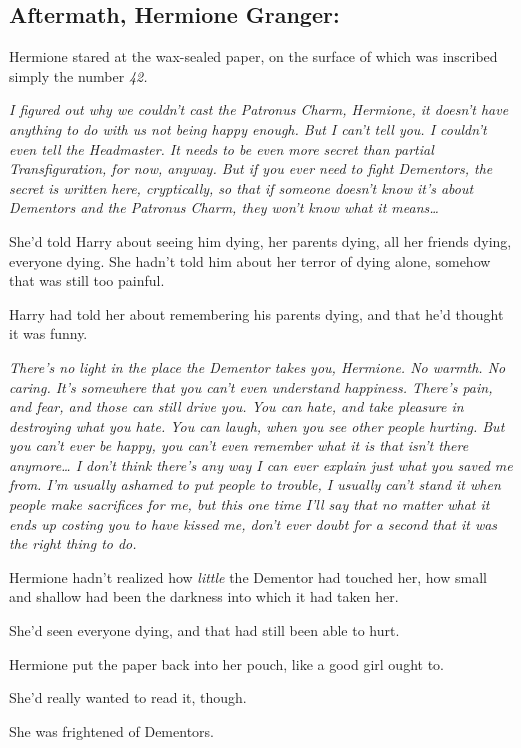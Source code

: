 \subsection{Aftermath, Hermione Granger:}

Hermione stared at the wax-sealed paper, on the surface of which was inscribed 
simply the number \emph{42.}

\emph{I figured out why we couldn't cast the Patronus Charm, Hermione, it 
doesn't have anything to do with us not being happy enough. But I can't tell 
you. I couldn't even tell the Headmaster. It needs to be even more secret than 
partial Transfiguration, for now, anyway. But if you ever need to fight 
Dementors, the secret is written here, cryptically, so that if someone doesn't 
know it's about Dementors and the Patronus Charm, they won't know what it 
means{\ldots}}

She'd told Harry about seeing him dying, her parents dying, all her friends 
dying, everyone dying. She hadn't told him about her terror of dying alone, 
somehow that was still too painful.

Harry had told her about remembering his parents dying, and that he'd thought 
it was funny.

\emph{There's no light in the place the Dementor takes you, Hermione. No 
warmth. No caring. It's somewhere that you can't even understand happiness. 
There's pain, and fear, and those can still drive you. You can hate, and take 
pleasure in destroying what you hate. You can laugh, when you see other people 
hurting. But you can't ever be happy, you can't even remember what it is that 
isn't there anymore{\ldots} I don't think there's any way I can ever explain 
just what you saved me from. I'm usually ashamed to put people to trouble, I 
usually can't stand it when people make sacrifices for me, but this one time 
I'll say that no matter what it ends up costing you to have kissed me, don't 
ever doubt for a second that it was the right thing to do.}

Hermione hadn't realized how \emph{little} the Dementor had touched her, how 
small and shallow had been the darkness into which it had taken her.

She'd seen everyone dying, and that had still been able to hurt.

Hermione put the paper back into her pouch, like a good girl ought to.

She'd really wanted to read it, though.

She was frightened of Dementors.
\sbreak
